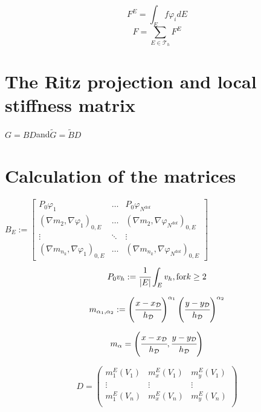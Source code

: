 \documentclass{article}
\begin{document}
$$F^E = \int_Ef\varphi_i dE$$
\begin{equation}
    F = \sum_{E \in \mathcal{T}_h}F^E
\end{equation}


\section{The Ritz projection and local stiffness matrix}
$G = BD $and$ \tilde{G} = \tilde{B}D$

\section{Calculation of the matrices}

$B_E := \begin{bmatrix}
    P_0\varphi_1 & \hdots & P_0 \varphi_{N^\text{dof}}\\
    (\nabla m_2,\nabla\varphi_1)_{0,E} & \hdots & (\nabla m_2,\nabla\varphi_{N^\text{dof}})_{0,E} \\
    \vdots & \ddots & \vdots \\
    (\nabla m_{n_k},\nabla\varphi_1)_{0,E} & \hdots & (\nabla m_{n_k},\nabla\varphi_{N^\text{dof}})_{0,E}
\end{bmatrix}$
\\

\begin{equation}
    P_0v_h := \cfrac{1}{|E|}\int_E v_h, \text{for} k\geq 2
\end{equation}

\begin{equation}
    m_{\alpha_1,\alpha_2} := \left(\cfrac{x - x_{\mathcal{D}}}{h_{\mathcal{D}}}\right)^{\alpha_1}
    \left(\cfrac{y - y_{\mathcal{D}}}{h_{\mathcal{D}}}\right)^{\alpha_2}
\end{equation}

\begin{equation}
    m_{\alpha} = \left(\cfrac{x-x_\mathcal{D}}{h_\mathcal{D}},\cfrac{y-y_\mathcal{D}}{h_\mathcal{D}}\right)
\end{equation}

\begin{equation}
    D = \begin{pmatrix}
        m_1^E(V_1) & m_x^E(V_1) & m_y^E(V_1) \\
        \vdots & \vdots & \vdots \\
        m_1^E(V_n) & m_x^E(V_n) & m_y^E(V_n) \\
    \end{pmatrix}
\end{equation}
\end{document}
